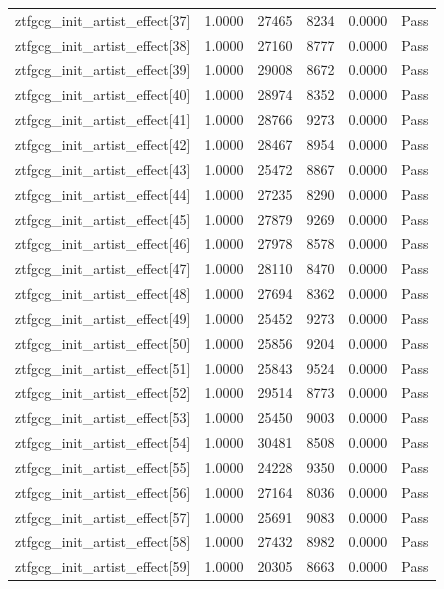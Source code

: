 \begin{table}[htbp]
\begin{tabular}{llrrll}
ztfgcg\_init\_artist\_effect[37] & 1.0000 & 27465 & 8234 & 0.0000 & Pass \\
ztfgcg\_init\_artist\_effect[38] & 1.0000 & 27160 & 8777 & 0.0000 & Pass \\
ztfgcg\_init\_artist\_effect[39] & 1.0000 & 29008 & 8672 & 0.0000 & Pass \\
ztfgcg\_init\_artist\_effect[40] & 1.0000 & 28974 & 8352 & 0.0000 & Pass \\
ztfgcg\_init\_artist\_effect[41] & 1.0000 & 28766 & 9273 & 0.0000 & Pass \\
ztfgcg\_init\_artist\_effect[42] & 1.0000 & 28467 & 8954 & 0.0000 & Pass \\
ztfgcg\_init\_artist\_effect[43] & 1.0000 & 25472 & 8867 & 0.0000 & Pass \\
ztfgcg\_init\_artist\_effect[44] & 1.0000 & 27235 & 8290 & 0.0000 & Pass \\
ztfgcg\_init\_artist\_effect[45] & 1.0000 & 27879 & 9269 & 0.0000 & Pass \\
ztfgcg\_init\_artist\_effect[46] & 1.0000 & 27978 & 8578 & 0.0000 & Pass \\
ztfgcg\_init\_artist\_effect[47] & 1.0000 & 28110 & 8470 & 0.0000 & Pass \\
ztfgcg\_init\_artist\_effect[48] & 1.0000 & 27694 & 8362 & 0.0000 & Pass \\
ztfgcg\_init\_artist\_effect[49] & 1.0000 & 25452 & 9273 & 0.0000 & Pass \\
ztfgcg\_init\_artist\_effect[50] & 1.0000 & 25856 & 9204 & 0.0000 & Pass \\
ztfgcg\_init\_artist\_effect[51] & 1.0000 & 25843 & 9524 & 0.0000 & Pass \\
ztfgcg\_init\_artist\_effect[52] & 1.0000 & 29514 & 8773 & 0.0000 & Pass \\
ztfgcg\_init\_artist\_effect[53] & 1.0000 & 25450 & 9003 & 0.0000 & Pass \\
ztfgcg\_init\_artist\_effect[54] & 1.0000 & 30481 & 8508 & 0.0000 & Pass \\
ztfgcg\_init\_artist\_effect[55] & 1.0000 & 24228 & 9350 & 0.0000 & Pass \\
ztfgcg\_init\_artist\_effect[56] & 1.0000 & 27164 & 8036 & 0.0000 & Pass \\
ztfgcg\_init\_artist\_effect[57] & 1.0000 & 25691 & 9083 & 0.0000 & Pass \\
ztfgcg\_init\_artist\_effect[58] & 1.0000 & 27432 & 8982 & 0.0000 & Pass \\
ztfgcg\_init\_artist\_effect[59] & 1.0000 & 20305 & 8663 & 0.0000 & Pass \\

\end{tabular}
\end{table}
